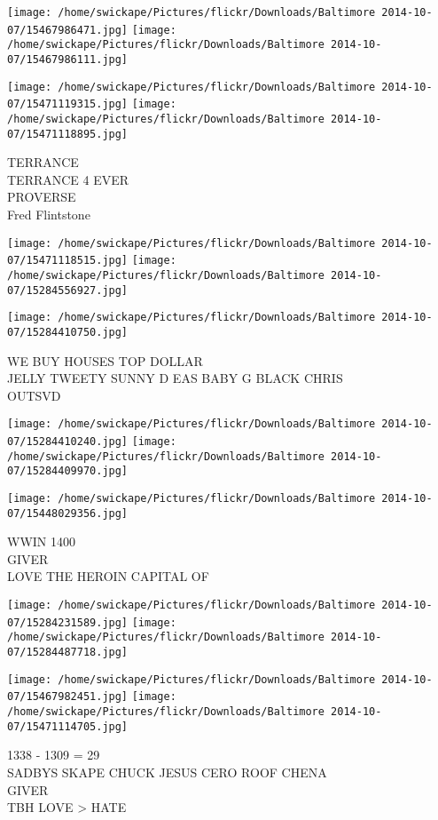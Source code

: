 \documentclass[10pt,letterpaper]{article}
\begin{document}
\texttt{[image: /home/swickape/Pictures/flickr/Downloads/Baltimore 2014-10-07/15467986471.jpg]}
\texttt{[image: /home/swickape/Pictures/flickr/Downloads/Baltimore 2014-10-07/15467986111.jpg]}

\texttt{[image: /home/swickape/Pictures/flickr/Downloads/Baltimore 2014-10-07/15471119315.jpg]}
\texttt{[image: /home/swickape/Pictures/flickr/Downloads/Baltimore 2014-10-07/15471118895.jpg]}

TERRANCE\\
TERRANCE 4 EVER\\
PROVERSE\\
Fred Flintstone\\
\pagebreak

\texttt{[image: /home/swickape/Pictures/flickr/Downloads/Baltimore 2014-10-07/15471118515.jpg]}
\texttt{[image: /home/swickape/Pictures/flickr/Downloads/Baltimore 2014-10-07/15284556927.jpg]}

\vspace{0.25in}
\texttt{[image: /home/swickape/Pictures/flickr/Downloads/Baltimore 2014-10-07/15284410750.jpg]}

WE BUY HOUSES TOP DOLLAR\\
JELLY TWEETY SUNNY D EAS BABY G BLACK CHRIS\\
OUTSVD\\
\pagebreak

\texttt{[image: /home/swickape/Pictures/flickr/Downloads/Baltimore 2014-10-07/15284410240.jpg]}
\texttt{[image: /home/swickape/Pictures/flickr/Downloads/Baltimore 2014-10-07/15284409970.jpg]}

\vspace{0.25in}
\texttt{[image: /home/swickape/Pictures/flickr/Downloads/Baltimore 2014-10-07/15448029356.jpg]}

WWIN 1400\\
GIVER\\
LOVE THE HEROIN CAPITAL OF\\
\pagebreak

\texttt{[image: /home/swickape/Pictures/flickr/Downloads/Baltimore 2014-10-07/15284231589.jpg]}
\texttt{[image: /home/swickape/Pictures/flickr/Downloads/Baltimore 2014-10-07/15284487718.jpg]}

\texttt{[image: /home/swickape/Pictures/flickr/Downloads/Baltimore 2014-10-07/15467982451.jpg]}
\texttt{[image: /home/swickape/Pictures/flickr/Downloads/Baltimore 2014-10-07/15471114705.jpg]}

1338 {-} 1309 = 29\\
SADBYS SKAPE CHUCK JESUS CERO ROOF CHENA\\
GIVER\\
TBH LOVE > HATE\\
\pagebreak
\end{document}
